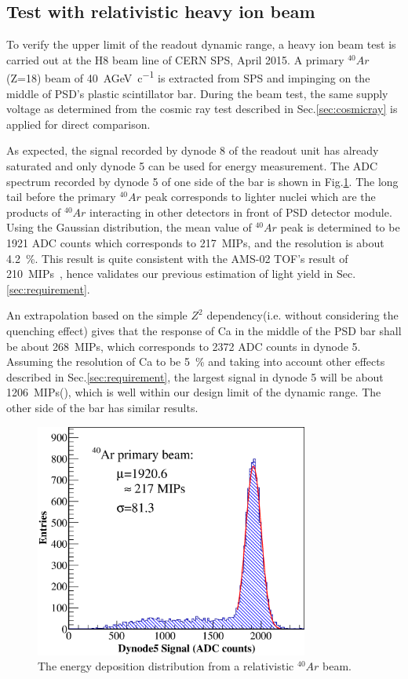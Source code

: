 \documentclass[5p, times]{elsarticle}
\begin{document}
\subsection{Test with relativistic heavy ion beam}
\label{sec:beam}
To verify the upper limit of the readout dynamic range, a heavy ion beam test is carried out at the H8 beam line of CERN SPS, April 2015.
A primary $^{40}{Ar}$(Z=18) beam of \SI{40}{AGeV\per c} is extracted from SPS and impinging on the middle of PSD's plastic scintillator bar.
During the beam test, the same supply voltage as determined from the cosmic ray test described in Sec.\ref{sec:cosmicray} is applied for direct comparison.
  
As expected, the signal recorded by dynode 8 of the readout unit has already saturated and only dynode 5 can be used for energy measurement.
The ADC spectrum recorded by dynode 5 of one side of the bar is shown in Fig.\ref{fig:Ar}. 
The long tail before the primary $^{40}Ar$ peak corresponds to lighter nuclei which are the products of $^{40}Ar$ interacting in other detectors in front of PSD detector module.
Using the Gaussian distribution, the mean value of $^{40}Ar$ peak is determined to be 1921 ADC counts which corresponds to \SI{217}{MIPs}, and the resolution is about \SI{4.2}{\percent}.
This result is quite consistent with the AMS-02 TOF's result of \SI{210}{MIPs}~\cite{bindi2005performance}, hence validates our previous estimation of light yield in Sec.\ref{sec:requirement}.

An extrapolation based on the simple $Z^2$ dependency(i.e. without considering the quenching effect) gives that the response of Ca in the middle of the PSD bar shall be about \SI{268}{MIPs}, which corresponds to 2372 ADC counts in dynode 5.
Assuming the resolution of Ca to be \SI{5}{\percent} and taking into account other effects described in Sec.\ref{sec:requirement}, the largest signal in dynode 5 will be about \SI{1206}{MIPs}(), which is well within our design limit of the dynamic range.
The other side of the bar has similar results.

\begin{figure}
 \centering
 \includegraphics[width=90mm]{Ar}
\caption{The energy deposition distribution from a relativistic $^{40}Ar$ beam.}
\label{fig:Ar}
\end{figure} 
\end{document}
